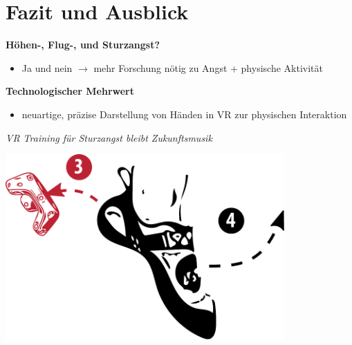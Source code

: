 \section{Fazit und Ausblick}

\begin{frame}{\currentname{}}
	\textbf{Höhen-, Flug-, \textcolor{secondary}{und Sturzangst?}}
	\begin{itemize}[label=\textcolor{tertiary}{}]
		\item Ja und nein $\rightarrow$ mehr Forschung nötig zu Angst + physische Aktivität
	\end{itemize}
	\textbf{Technologischer Mehrwert}
	\begin{itemize}[label=\textcolor{tertiary}{}]
		\item neuartige, präzise Darstellung von Händen in VR zur physischen Interaktion
	\end{itemize}
	\vfill{}
	\hfill{}\textit{VR  Training für Sturzangst bleibt Zukunftsmusik} \textcolor{secondary}{}
\end{frame}

\begin{frame}[plain]
\begin{center}
	\includegraphics[width=0.8\textwidth]{include/images/climbing-shoe-with-instructions-off.pdf}
\end{center}
\end{frame}
